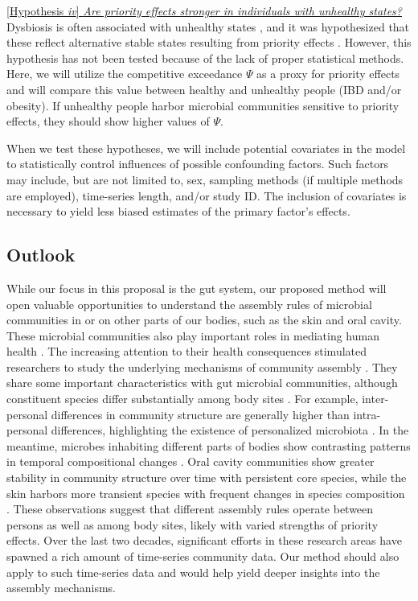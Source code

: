 \documentclass[12pt, class=article, crop=false]{standalone}
\begin{document}
\ul{[Hypothesis \textit{iv}] \textit{Are priority effects stronger in individuals with unhealthy states?}}
Dysbiosis is often associated with unhealthy states \citep{petersen_defining_2014, fierer_animalcules_2012}, and it was hypothesized that these reflect alternative stable states resulting from priority effects \citep{fierer_animalcules_2012}.
However, this hypothesis has not been tested because of the lack of proper statistical methods.
Here, we will utilize the competitive exceedance $\Psi$ as a proxy for priority effects and will compare this value between healthy and unhealthy people (IBD and/or obesity).
If unhealthy people harbor microbial communities sensitive to priority effects, they should show higher values of $\Psi$.

When we test these hypotheses, we will include potential covariates in the model to statistically control influences of possible confounding factors.
Such factors may include, but are not limited to, sex, sampling methods (if multiple methods are employed), time-series length, and/or study ID.
The inclusion of covariates is necessary to yield less biased estimates of the primary factor's effects.

\subsection*{Outlook}
While our focus in this proposal is the gut system, our proposed method will open valuable opportunities to understand the assembly rules of microbial communities in or on other parts of our bodies, such as the skin and oral cavity.
These microbial communities also play important roles in mediating human health \citep{fierer_animalcules_2012}.
The increasing attention to their health consequences stimulated researchers to study the underlying mechanisms of community assembly \citep{grice_topographical_2009, jakobsson_short-term_2010, costello_bacterial_2009, caporaso_moving_2011}.
They share some important characteristics with gut microbial communities, although constituent species differ substantially among body sites \citep{costello_bacterial_2009}.
For example, inter-personal differences in community structure are generally higher than intra-personal differences, highlighting the existence of personalized microbiota \citep{costello_bacterial_2009}.
In the meantime, microbes inhabiting different parts of bodies show contrasting patterns in temporal compositional changes \citep{costello_bacterial_2009, caporaso_moving_2011, fierer_animalcules_2012, jakobsson_short-term_2010}.
Oral cavity communities show greater stability in community structure over time with persistent core species, while the skin harbors more transient species with frequent changes in species composition \citep{costello_bacterial_2009}.
These observations suggest that different assembly rules operate between persons as well as among body sites, likely with varied strengths of priority effects.
Over the last two decades, significant efforts in these research areas have spawned a rich amount of time-series community data.
Our method should also apply to such time-series data and would help yield deeper insights into the assembly mechanisms.
\end{document}
